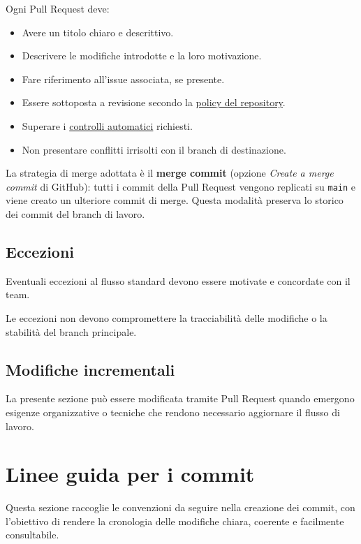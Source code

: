 \documentclass[11pt, a4paper]{article}
\begin{document}
Ogni Pull Request deve:
\begin{itemize}
    \item Avere un titolo chiaro e descrittivo.
    \item Descrivere le modifiche introdotte e la loro motivazione.
    \item Fare riferimento all'issue associata, se presente.
    \item Essere sottoposta a revisione secondo la \hyperref[subsec:regole-generali]{policy del repository}.
    \item Superare i \href{https://github.com/On-By-One-Team/On-By-One.github.io/tree/main/.github/workflows}{controlli automatici} richiesti.
    \item Non presentare conflitti irrisolti con il branch di destinazione.
\end{itemize}

\noindent La strategia di merge adottata è il \textbf{merge commit} (opzione \textit{Create a merge commit} di GitHub): tutti i commit della Pull Request vengono replicati su \texttt{main} e viene creato un ulteriore commit di merge. Questa modalità preserva lo storico dei commit del branch di lavoro.

\subsection{Eccezioni}

Eventuali eccezioni al flusso standard devono essere motivate e concordate con il team.

Le eccezioni non devono compromettere la tracciabilità delle modifiche o la stabilità del branch principale.

\subsection{Modifiche incrementali}

La presente sezione può essere modificata tramite Pull Request quando emergono esigenze organizzative o tecniche che rendono necessario aggiornare il flusso di lavoro.

\section{Linee guida per i commit}
\label{sec:linee-guida-per-i-commit}

Questa sezione raccoglie le convenzioni da seguire nella creazione dei commit, con l'obiettivo di rendere la cronologia delle modifiche chiara, coerente e facilmente consultabile.
\end{document}
